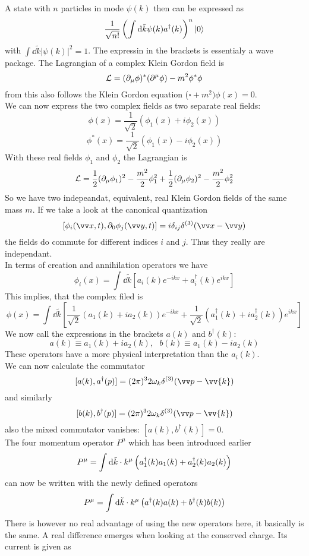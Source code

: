 A state with $n$ particles in mode $\psi(k)$ then can be expressed as
\[ \frac{1}{\sqrt{n!}} \left( \int {\rm d} \tilde{k} \psi(k) a^\dagger(k) \right)^n | 0 \rangle\]
with $\int \dd \tilde{k} | \psi(k) |^2 = 1$. The expressin in the brackets is essentialy a wave package.
The Lagrangian of a complex Klein Gordon field is
\[ \mathcal{L} = ( \partial_\mu \phi) ^* ( \partial ^\mu \phi) - m^2 \phi^* \phi \]
from this also follows the Klein Gordon equation ($\square + m^2) \phi(x) = 0$.\\
We can now express the two complex fields as two separate real fields:
\[ \phi(x) = \frac{1}{\sqrt{2}} \left( \phi_1(x) + i \phi_2(x) \right)\]
\[ \phi^*(x) = \frac{1}{\sqrt{2}} \left( \phi_1(x) - i \phi_2(x) \right)\]
With these real fields $\phi_1$ and $\phi_2$ the Lagrangian is
\[ \mathcal{L} = \frac{1}{2} ( \partial_\mu \phi_1)^2 - \frac{m^2}{2} \phi_1^2 + \frac{1}{2} (\partial_\mu\phi_2)^2 - \frac{m^2}{2} \phi_2^2\]
So we have two indepeandat, equivalent, real Klein Gordon fields of the same mass $m$. If we take a look at the canonical quantization
\[ [ \phi_i (\vx, t), \p_0 \phi_j(\vy, t) ] = i \delta_{ij} \delta^{(3)}( \vx - \vy) \]
the fields do commute for different indices $i$ and $j$. Thus they really are independant.\\
In terms of creation and annihilation operators we have
\[ \phi_i(x) = \int \dd \tilde{k} \left[ a_i(k) e^{-ikx} + a_i^\dagger(k) e^{ikx} \right]\]
This implies, that the complex filed is
\[ \phi(x) = \int \dd \tilde{k} \left[ \frac{1}{\sqrt{2}} \left(a_1(k) + i a_2(k)\right) e^{-ikx} + \frac{1}{\sqrt{2}} \left( a_1^\dagger(k) + i a_2^\dagger(k)\right)e^{ikx} \right]\]
We now call the expressions in the brackets $a(k)$ and $b^\dagger(k)$:
\[ a(k) \equiv a_1(k) + i a_2(k), ~~~ b(k) \equiv a_1(k) - i a_2(k)\]
These operators have a more physical interpretation than the $a_i(k)$.\\
We can now calculate the commutator
\[ [a(k), a^\dagger(p)] = (2\pi)^3 2 \omega_k \delta^{(3)}(\vp - \vv{k})\]
and similarly
\[ [b(k), b^\dagger(p)] = (2\pi)^3 2 \omega_k \delta^{(3)}(\vp - \vv{k})\]
also the mixed commutator vanishes: $[a(k), b^\dagger(k)] = 0$.\\
The four momentum operator $P^\mu$ which has been introduced earlier
\[ P^\mu = \int {\rm d} \tilde{k} \cdot k^\mu \left( a_1^\dagger(k) a_1(k) + a_2^\dagger(k) a_2(k)\right)\]
can now be written with the newly defined operators
\[ P^\mu = \int {\rm d} \tilde{k} \cdot k^\mu \left( a^\dagger(k) a(k) + b^\dagger(k) b(k) \right)\]
There is however no real advantage of using the new operators here, it basically is the same. A real difference emerges when looking at the conserved charge. Its current is given as
